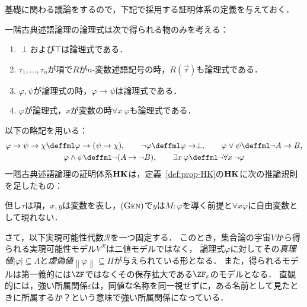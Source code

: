 \documentclass[realisability.tex]{subfiles}
\begin{document}
基礎に関わる議論をするので，下記で採用する証明体系の定義を与えておく．
\begin{definition}
 一階古典述語論理の論理式は次で得られる物のみを考える：
 \begin{enumerate}[series=fml-def]
  \item $\perp$および$\top$は論理式である．
  \item $\tau_1, \dots, \tau_n$が項で$R$が$n$-変数述語記号の時，$R(\vec{\tau})$も論理式である．
  \item $\varphi, \psi$が論理式の時，$\varphi \to \psi$は論理式である．
  \item $\varphi$が論理式，$x$が変数の時$\forall x\: \varphi$も論理式である．
 \end{enumerate}
 以下の略記を用いる：
 \begin{gather*}
  \varphi \to \psi \to \chi \deffml \varphi \to (\psi \to \chi),\qquad
  \neg \varphi \deffml \varphi \to \perp,\qquad
  \varphi \lor \psi \deffml \neg A \to B,\\
  \varphi \land \psi \deffml \neg (A \to \neg B),\qquad
  \exists x \: \varphi \deffml \neg \forall x\: \neg \varphi
 \end{gather*}
 一階古典述語論理の証明体系$\mathord{\mathbf{HK}}$は，定義~\ref{def:prop-HK}の$\mathord{\mathbf{HK}}$に次の推論規則を足したもの：
 \begin{center}
 \end{center} 
 但し$\tau$は項，$x, y$は変数を表し，$(\mathord{\textsc{Gen}})$で$y$は$M: \varphi$を導く前提と$\forall x \varphi$に自由変数として現れない．
\end{definition}
さて，以下実現可能性代数$\mathcal{R}$を一つ固定する．
このとき，集合論の宇宙$V$から得られる実現可能性モデル$V^{\mathcal{R}}$は二値モデルではなく，
論理式$\varphi$に対してその\emph{真理値}$|\varphi| \subseteq \Lambda$と\emph{虚偽値}$\left\|\varphi\right\| \subseteq \Pi$が与えられている形となる．
また，得られるモデルは第一義的には$\ZF$ではなくその保存拡大である$\ZF_\varepsilon$のモデルとなる．
直観的には，強い所属関係$\varepsilon$は，同値な名称を同一視せずに，ある名前として見たときに所属するか？という意味で強い所属関係になっている．
\end{document}
